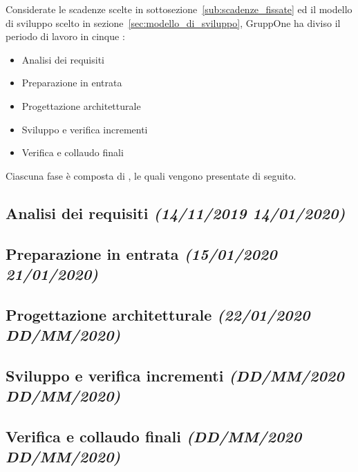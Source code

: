 \documentclass[../piano-di-progetto.tex]{subfiles}
\begin{document}
Considerate le scadenze scelte in sottosezione~\ref{sub:scadenze_fissate} ed il modello di sviluppo scelto in sezione~\ref{sec:modello_di_sviluppo}, GruppOne ha diviso il periodo di lavoro in cinque :
\begin{itemize}
  \item Analisi dei requisiti
  \item Preparazione in entrata
  \item Progettazione architetturale
  \item Sviluppo e verifica incrementi
  \item Verifica e collaudo finali
\end{itemize}
Ciascuna fase è composta di , le quali vengono presentate di seguito.
\subsection[Analisi dei requisiti]{Analisi dei requisiti {\normalsize\normalfont\itshape(14/11/2019  14/01/2020)}}%
\label{sub:analisi_dei_requisiti}

\subsection[Preparazione in entrata]{Preparazione in entrata {\normalsize\normalfont\itshape(15/01/2020  21/01/2020)}}%
\label{sub:preparazione_in_entrata}

\subsection[Progettazione architetturale]{Progettazione architetturale {\normalsize\normalfont\itshape(22/01/2020  DD/MM/2020)}}%
\label{sub:progettazione_architetturale}

\subsection[Sviluppo e verifica incrementi]{Sviluppo e verifica incrementi {\normalsize\normalfont\itshape(DD/MM/2020  DD/MM/2020)}}%
\label{sub:sviluppo_e_verifica_incrementi}

\subsection[Verifica e collaudo finali]{Verifica e collaudo finali {\normalsize\normalfont\itshape(DD/MM/2020  DD/MM/2020)}}%
\label{sub:verifica_e_collaudo_finali}

\end{document}
